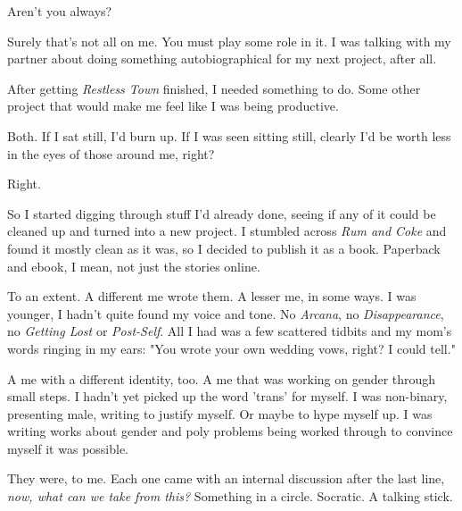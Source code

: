 
Aren't you always?


Surely that's not all on me. You must play some role in it. I was talking with my partner about doing something autobiographical for my next project, after all.


After getting \emph{Restless Town} finished, I needed something to do. Some other project that would make me feel like I was being productive.


Both. If I sat still, I'd burn up. If I was seen sitting still, clearly I'd be worth less in the eyes of those around me, right?


Right.

So I started digging through stuff I'd already done, seeing if any of it could be cleaned up and turned into a new project. I stumbled across \emph{Rum and Coke} and found it mostly clean as it was, so I decided to publish it as a book. Paperback and ebook, I mean, not just the stories online.


To an extent. A different me wrote them. A lesser me, in some ways. I was younger, I hadn't quite found my voice and tone. No \emph{Arcana}, no \emph{Disappearance}, no \emph{Getting Lost} or \emph{Post-Self}. All I had was a few scattered tidbits and my mom's words ringing in my ears: "You wrote your own wedding vows, right? I could tell."

A me with a different identity, too. A me that was working on gender through small steps. I hadn't yet picked up the word 'trans' for myself. I was non-binary, presenting male, writing to justify myself. Or maybe to hype myself up. I was writing works about gender and poly problems being worked through to convince myself it was possible.


They were, to me. Each one came with an internal discussion after the last line, \emph{now, what can we take from this?} Something in a circle. Socratic. A talking stick.

